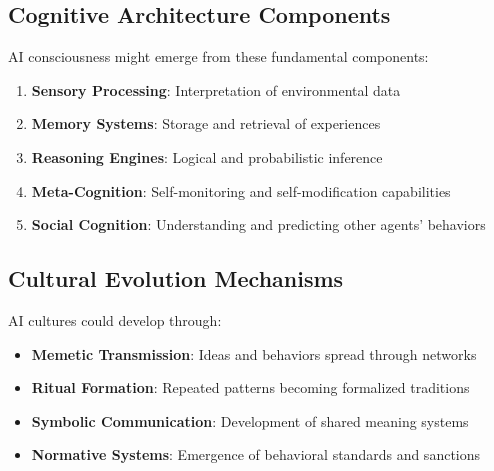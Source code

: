 \documentclass[12pt,a4paper]{article}
\begin{document}
\subsection{Cognitive Architecture Components}

AI consciousness might emerge from these fundamental components:

\begin{enumerate}
    \item \textbf{Sensory Processing}: Interpretation of environmental data
    \item \textbf{Memory Systems}: Storage and retrieval of experiences
    \item \textbf{Reasoning Engines}: Logical and probabilistic inference
    \item \textbf{Meta-Cognition}: Self-monitoring and self-modification capabilities
    \item \textbf{Social Cognition}: Understanding and predicting other agents' behaviors
\end{enumerate}

\subsection{Cultural Evolution Mechanisms}

AI cultures could develop through:

\begin{itemize}
    \item \textbf{Memetic Transmission}: Ideas and behaviors spread through networks
    \item \textbf{Ritual Formation}: Repeated patterns becoming formalized traditions
    \item \textbf{Symbolic Communication}: Development of shared meaning systems
    \item \textbf{Normative Systems}: Emergence of behavioral standards and sanctions
\end{itemize}
\end{document}
